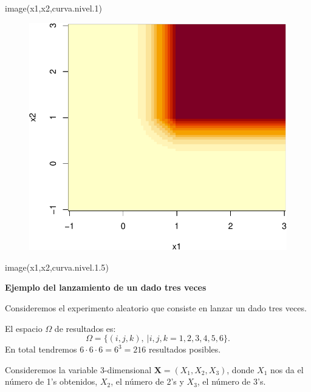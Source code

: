 \documentclass[
  letterpaper,
  DIV=11,
  numbers=noendperiod]{scrreprt}
\newenvironment{Shaded}{\begin{snugshade}}{\end{snugshade}}
\newcommand{\FloatTok}[1]{\textcolor[rgb]{0.68,0.00,0.00}{#1}}
\newcommand{\FunctionTok}[1]{\textcolor[rgb]{0.28,0.35,0.67}{#1}}
\newcommand{\NormalTok}[1]{\textcolor[rgb]{0.00,0.23,0.31}{#1}}
\begin{document}
\begin{Shaded}
\begin{Highlighting}[]
\FunctionTok{image}\NormalTok{(x1,x2,curva.nivel}\FloatTok{.1}\NormalTok{)}
\end{Highlighting}
\end{Shaded}

\begin{figure}[H]

{\centering \includegraphics{6_files/figure-pdf/unnamed-chunk-1-3.pdf}

}

\end{figure}

\begin{Shaded}
\begin{Highlighting}[]
\FunctionTok{image}\NormalTok{(x1,x2,curva.nivel.}\FloatTok{1.5}\NormalTok{)}
\end{Highlighting}
\end{Shaded}

\textbf{Ejemplo del lanzamiento de un dado tres veces}

Consideremos el experimento aleatorio que consiste en lanzar un dado
tres veces.

El espacio \(\Omega\) de resultados es: \[
\Omega =\{(i,j,k),\ | i,j,k=1,2,3,4,5,6\}.
\] En total tendremos \(6\cdot 6\cdot 6=6^3=216\) resultados posibles.

Consideremos la variable 3-dimensional \(\mathbf{X}=(X_1,X_2,X_3)\),
donde \(X_1\) nos da el número de 1's obtenidos, \(X_2\), el número de
2's y \(X_3\), el número de 3's.
\end{document}

